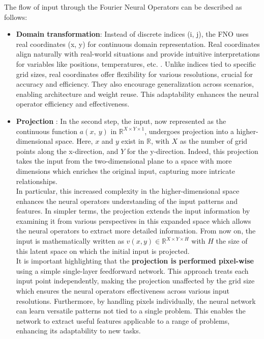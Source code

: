 
The flow of input through the Fourier Neural Operators can be described as follows:

\begin{itemize}
	\item \textbf{Domain transformation}: Instead of discrete indices (i, j), the FNO uses real coordinates (x, y) for continuous domain representation. Real coordinates align naturally with real-world situations and provide intuitive interpretations for variables like positions, temperatures, etc. . Unlike indices tied to specific grid sizes, real coordinates offer flexibility for various resolutions, crucial for accuracy and efficiency. They also encourage generalization across scenarios, enabling architecture and weight reuse. This adaptability enhances the neural operator efficiency and effectiveness.
	
	\vspace{1em}	
	
	\item \textbf{Projection} : In the second step, the input, now represented as the continuous function $a(x, \ y)$ in $\mathbb{R}^{X \times Y \times 1}$, undergoes projection into a higher-dimensional space. Here, $x$ and $y$ exist in $\mathbb{R}$, with $X$ as the number of grid points along the x-direction, and $Y$ for the y-direction. Indeed, this projection takes the input from the two-dimensional plane to a space with more dimensions which enriches the original input, capturing more intricate relationships.\\
	
In particular, this increased complexity in the higher-dimensional space enhances the neural operators understanding of the input patterns and features. In simpler terms, the projection extends the input information by examining it from various perspectives in this expanded space which allows the neural operators to extract more detailed information. From now on, the input is mathematically written as $v(x, y) \in \mathbb{R}^{X \times Y \times H}$ with $H$ the size of this latent space on which the initial input is projected.\\
	
It is important highlighting that the \textbf{projection is performed pixel-wise} using a simple single-layer feedforward network. This approach treats each input point independently, making the projection unaffected by the grid size which ensures the neural operators effectiveness across various input resolutions. Furthermore, by handling pixels individually, the neural network can learn versatile patterns not tied to a single problem. This enables the network to extract useful features applicable to a range of problems, enhancing its adaptability to new tasks.


\end{itemize}
